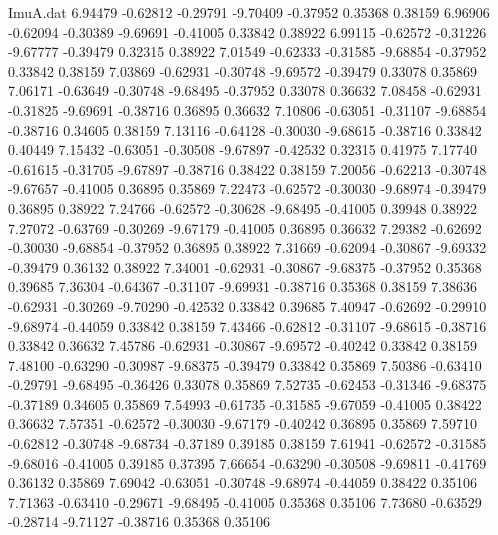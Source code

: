 \begin{filecontents}{ImuA.dat}
   6.94479   -0.62812   -0.29791   -9.70409   -0.37952    0.35368    0.38159
   6.96906   -0.62094   -0.30389   -9.69691   -0.41005    0.33842    0.38922
   6.99115   -0.62572   -0.31226   -9.67777   -0.39479    0.32315    0.38922
   7.01549   -0.62333   -0.31585   -9.68854   -0.37952    0.33842    0.38159
   7.03869   -0.62931   -0.30748   -9.69572   -0.39479    0.33078    0.35869
   7.06171   -0.63649   -0.30748   -9.68495   -0.37952    0.33078    0.36632
   7.08458   -0.62931   -0.31825   -9.69691   -0.38716    0.36895    0.36632
   7.10806   -0.63051   -0.31107   -9.68854   -0.38716    0.34605    0.38159
   7.13116   -0.64128   -0.30030   -9.68615   -0.38716    0.33842    0.40449
   7.15432   -0.63051   -0.30508   -9.67897   -0.42532    0.32315    0.41975
   7.17740   -0.61615   -0.31705   -9.67897   -0.38716    0.38422    0.38159
   7.20056   -0.62213   -0.30748   -9.67657   -0.41005    0.36895    0.35869
   7.22473   -0.62572   -0.30030   -9.68974   -0.39479    0.36895    0.38922
   7.24766   -0.62572   -0.30628   -9.68495   -0.41005    0.39948    0.38922
   7.27072   -0.63769   -0.30269   -9.67179   -0.41005    0.36895    0.36632
   7.29382   -0.62692   -0.30030   -9.68854   -0.37952    0.36895    0.38922
   7.31669   -0.62094   -0.30867   -9.69332   -0.39479    0.36132    0.38922
   7.34001   -0.62931   -0.30867   -9.68375   -0.37952    0.35368    0.39685
   7.36304   -0.64367   -0.31107   -9.69931   -0.38716    0.35368    0.38159
   7.38636   -0.62931   -0.30269   -9.70290   -0.42532    0.33842    0.39685
   7.40947   -0.62692   -0.29910   -9.68974   -0.44059    0.33842    0.38159
   7.43466   -0.62812   -0.31107   -9.68615   -0.38716    0.33842    0.36632
   7.45786   -0.62931   -0.30867   -9.69572   -0.40242    0.33842    0.38159
   7.48100   -0.63290   -0.30987   -9.68375   -0.39479    0.33842    0.35869
   7.50386   -0.63410   -0.29791   -9.68495   -0.36426    0.33078    0.35869
   7.52735   -0.62453   -0.31346   -9.68375   -0.37189    0.34605    0.35869
   7.54993   -0.61735   -0.31585   -9.67059   -0.41005    0.38422    0.36632
   7.57351   -0.62572   -0.30030   -9.67179   -0.40242    0.36895    0.35869
   7.59710   -0.62812   -0.30748   -9.68734   -0.37189    0.39185    0.38159
   7.61941   -0.62572   -0.31585   -9.68016   -0.41005    0.39185    0.37395
   7.66654   -0.63290   -0.30508   -9.69811   -0.41769    0.36132    0.35869
   7.69042   -0.63051   -0.30748   -9.68974   -0.44059    0.38422    0.35106
   7.71363   -0.63410   -0.29671   -9.68495   -0.41005    0.35368    0.35106
   7.73680   -0.63529   -0.28714   -9.71127   -0.38716    0.35368    0.35106

\end{filecontents}
